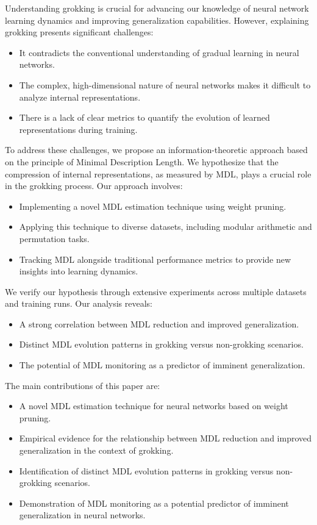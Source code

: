 \documentclass{article} %
\begin{document}
Understanding grokking is crucial for advancing our knowledge of neural network learning dynamics and improving generalization capabilities. However, explaining grokking presents significant challenges:

\begin{itemize}
    \item It contradicts the conventional understanding of gradual learning in neural networks.
    \item The complex, high-dimensional nature of neural networks makes it difficult to analyze internal representations.
    \item There is a lack of clear metrics to quantify the evolution of learned representations during training.
\end{itemize}

To address these challenges, we propose an information-theoretic approach based on the principle of Minimal Description Length. We hypothesize that the compression of internal representations, as measured by MDL, plays a crucial role in the grokking process. Our approach involves:

\begin{itemize}
    \item Implementing a novel MDL estimation technique using weight pruning.
    \item Applying this technique to diverse datasets, including modular arithmetic and permutation tasks.
    \item Tracking MDL alongside traditional performance metrics to provide new insights into learning dynamics.
\end{itemize}

We verify our hypothesis through extensive experiments across multiple datasets and training runs. Our analysis reveals:

\begin{itemize}
    \item A strong correlation between MDL reduction and improved generalization.
    \item Distinct MDL evolution patterns in grokking versus non-grokking scenarios.
    \item The potential of MDL monitoring as a predictor of imminent generalization.
\end{itemize}

The main contributions of this paper are:

\begin{itemize}
    \item A novel MDL estimation technique for neural networks based on weight pruning.
    \item Empirical evidence for the relationship between MDL reduction and improved generalization in the context of grokking.
    \item Identification of distinct MDL evolution patterns in grokking versus non-grokking scenarios.
    \item Demonstration of MDL monitoring as a potential predictor of imminent generalization in neural networks.
\end{itemize}
\end{document}
